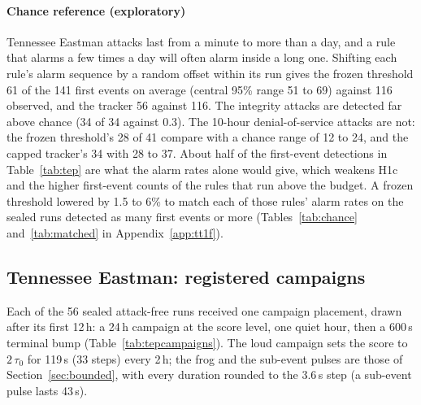 \documentclass[letterpaper,twocolumn,10pt]{article}
\begin{document}
\paragraph{Chance reference (exploratory)}
Tennessee Eastman attacks last from a minute to more than a day, and a rule that alarms a few times a
day will often alarm inside a long one. Shifting each rule's alarm sequence by a random offset within
its run gives the frozen threshold 61 of the 141 first events on average (central 95\% range 51 to
69) against 116 observed, and the tracker 56 against 116. The integrity attacks are detected far above
chance (34 of 34 against 0.3). The 10-hour denial-of-service attacks are not: the frozen threshold's 28
of 41 compare with a chance range of 12 to 24, and the capped tracker's 34 with 28 to 37. About half
of the first-event detections in Table~\ref{tab:tep} are what the alarm rates alone would give, which
weakens H1c and the higher first-event counts of the rules that run above the budget. A frozen
threshold lowered by 1.5 to 6\% to match each of those rules' alarm rates on the sealed runs detected
as many first events or more (Tables~\ref{tab:chance} and~\ref{tab:matched} in Appendix~\ref{app:tt1f}).

\subsection{Tennessee Eastman: registered campaigns}
\label{sec:tepcampaigns}

Each of the 56 sealed attack-free runs received one campaign placement, drawn after its first 12\,h: a
24\,h campaign at the score level, one quiet hour, then a 600\,s terminal bump
(Table~\ref{tab:tepcampaigns}). The loud campaign sets the score to $2\,\tau_0$ for 119\,s (33 steps) every 2\,h;
the frog and the sub-event pulses are those of Section~\ref{sec:bounded}, with every duration rounded
to the 3.6\,s step (a sub-event pulse lasts 43\,s).
\end{document}
